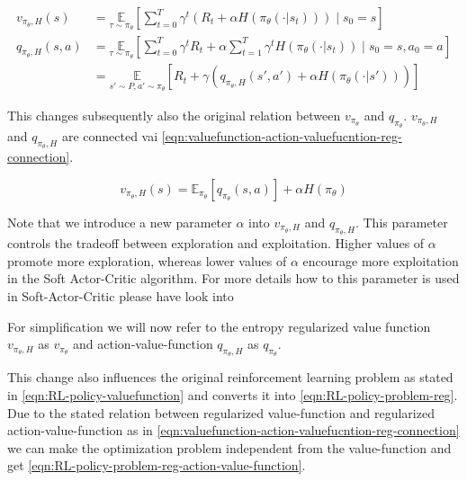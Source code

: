 \begin{align}
	v_{\pi_\theta, H}(s) &= \underset{\tau\sim\pi_\theta}{\mathbb{E}}\left[\sum_{t=0}^T\gamma^t\left(R_t + \alpha H(\pi_\theta(\cdot|s_t))\right)\mid s_0 = s\right]\label{eqn:valuefunction-entropy-reg} \\
	q_{\pi_\theta, H}(s, a) &= \underset{\tau\sim\pi_\theta}{\mathbb{E}}\left[\sum_{t=0}^T\gamma^t R_t + \alpha \sum_{t=1}^T \gamma^t H(\pi_\theta(\cdot|s_t))\mid s_0 = s, a_0=a\right]\label{eqn:action-valuefunction-entropy-reg} \\
	&= \underset{s'\sim P, a' \sim \pi_\theta}{\mathbb{E}}\left[R_t + \gamma (q_{\pi_\theta, H}(s', a') + \alpha H(\pi_\theta(\cdot|s')))\right]\label{eqn:action-valuefunction-entropy-reg-recursive} 
\end{align} 

This changes subsequently also the original relation between $v_{\pi_\theta}$ and $q_{\pi_\theta}$. $v_{\pi_\theta, H}$ and $q_{\pi_\theta, H}$ are connected vai \eqref{eqn:valuefunction-action-valuefucntion-reg-connection}.

\begin{equation}\label{eqn:valuefunction-action-valuefucntion-reg-connection}
	v_{\pi_\theta, H}(s) = \mathbb{E}_{\pi_\theta}\left[q_{\pi_\theta}(s, a)\right] + \alpha H(\pi_\theta)
\end{equation} 

Note that we introduce a new parameter $\alpha$ into $v_{\pi_\theta,H}$ and $q_{\pi_\theta,H}$. This parameter controls the tradeoff between exploration and exploitation.  Higher values of $\alpha$ promote more exploration, whereas lower values of $\alpha$ encourage more exploitation in the Soft Actor-Critic algorithm. For more details how to this parameter is used in Soft-Actor-Critic please have look into 

For simplification we will now refer to the entropy regularized value function $v_{\pi_\theta,H}$ as $v_{\pi_\theta}$ and action-value-function $q_{\pi_\theta,H}$ as $q_{\pi_\theta}$. 

This change also influences the original reinforcement learning problem as stated in \eqref{eqn:RL-policy-valuefunction} and converts it into \eqref{eqn:RL-policy-problem-reg}. Due to the stated relation between regularized value-function and regularized action-value-function as in \eqref{eqn:valuefunction-action-valuefucntion-reg-connection} we can make the optimization problem independent from the value-function and get \eqref{eqn:RL-policy-problem-reg-action-value-function}.

